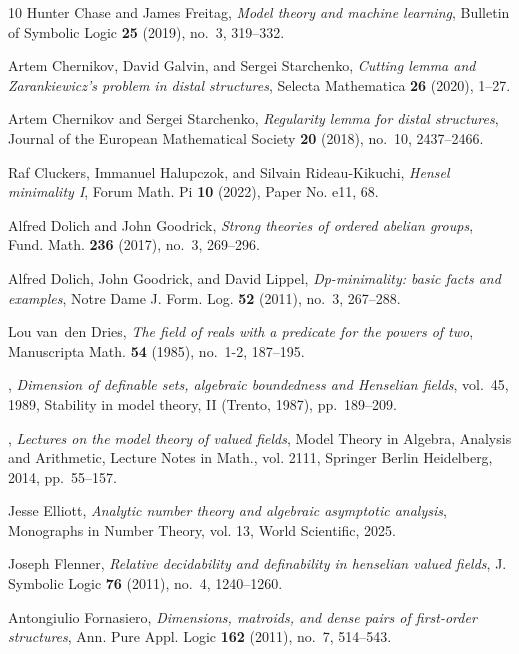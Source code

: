 \documentclass[11pt]{amsart}
\theoremstyle{plain}
\theoremstyle{definition}
\numberwithin{equation}{section}
\newcommand\0{\varnothing}
\begin{document}
\begin{thebibliography}{10}
Hunter Chase and James Freitag, \emph{Model theory and machine learning},
  Bulletin of Symbolic Logic \textbf{25} (2019), no.~3, 319--332.

Artem Chernikov, David Galvin, and Sergei Starchenko, \emph{Cutting lemma and
  {Z}arankiewicz’s problem in distal structures}, Selecta Mathematica
  \textbf{26} (2020), 1--27.

Artem Chernikov and Sergei Starchenko, \emph{Regularity lemma for distal
  structures}, Journal of the European Mathematical Society \textbf{20} (2018),
  no.~10, 2437--2466.

Raf Cluckers, Immanuel Halupczok, and Silvain Rideau-Kikuchi, \emph{Hensel
  minimality {I}}, Forum Math. Pi \textbf{10} (2022), Paper No. e11, 68.

Alfred Dolich and John Goodrick, \emph{Strong theories of ordered abelian
  groups}, Fund. Math. \textbf{236} (2017), no.~3, 269--296.

Alfred Dolich, John Goodrick, and David Lippel, \emph{Dp-minimality: basic
  facts and examples}, Notre Dame J. Form. Log. \textbf{52} (2011), no.~3,
  267--288.

Lou van~den Dries, \emph{The field of reals with a predicate for the powers of
  two}, Manuscripta Math. \textbf{54} (1985), no.~1-2, 187--195.

\bysame, \emph{Dimension of definable sets, algebraic boundedness and
  {H}enselian fields}, vol.~45, 1989, Stability in model theory, II (Trento,
  1987), pp.~189--209.

\bysame, \emph{Lectures on the model theory of valued fields}, Model Theory in
  Algebra, Analysis and Arithmetic, Lecture Notes in Math., vol. 2111, Springer
  Berlin Heidelberg, 2014, pp.~55--157.

Jesse Elliott, \emph{Analytic number theory and algebraic asymptotic analysis}, Monographs in Number Theory, vol. 13, World Scientific, 2025.

Joseph Flenner, \emph{Relative decidability and definability in henselian
  valued fields}, J. Symbolic Logic \textbf{76} (2011), no.~4, 1240--1260.

Antongiulio Fornasiero, \emph{Dimensions, matroids, and dense pairs of
  first-order structures}, Ann. Pure Appl. Logic \textbf{162} (2011), no.~7,
  514--543.


\end{thebibliography}
\end{document}
